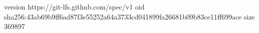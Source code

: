 version https://git-lfs.github.com/spec/v1
oid sha256:43ab69b9ff6ad87f3e55252a64a3733cd041899fa26681b09b83ce11ff699ace
size 369897
